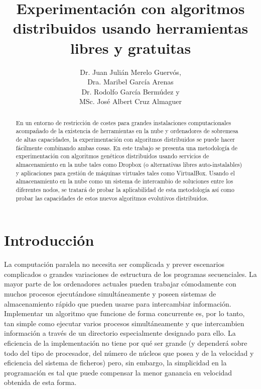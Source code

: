 \documentclass{article}
\title{Experimentación con algoritmos distribuidos usando herramientas libres y gratuitas}
\author{Dr. Juan Julián Merelo Guervós,\\
Dra. Maribel García Arenas\\
Dr. Rodolfo García Bermúdez y \\
MSc. José Albert Cruz Almaguer 
}
\begin{document}
\maketitle

\begin{abstract}
En un entorno de restricción de costes para grandes instalaciones
computacionales acompañado de la existencia de herramientas en la nube
y ordenadores de sobremesa de altas capacidades, la experimentación
con algoritmos distribuidos se puede hacer fácilmente combinando ambas
cosas. En este trabajo se presenta una metodología de experimentación
con algoritmos genéticos distribuidos usando servicios de
almacenamiento en la nube tales como Dropbox (o alternativas libres
auto-instalables) y aplicaciones para gestión de máquinas virtuales
tales como VirtualBox. Usando el almacenamiento en la nube como un
sistema de intercambio de soluciones entre los diferentes nodos, se
tratará de probar la aplicabilidad de esta metodología así como probar
las capacidades de estos nuevos algoritmos evolutivos distribuidos. 
\end{abstract}

\section{Introducción}

La computación paralela no necesita ser complicada y prever escenarios
complicados o grandes variaciones de estructura de los programas
secuenciales. La mayor parte de los ordenadores actuales pueden
trabajar cómodamente con muchos procesos ejecutándose simultáneamente
y poseen sistemas de almacenamiento rápido que pueden usarse para
intercambiar información. Implementar un algoritmo que funcione de
forma concurrente es, por lo tanto, tan simple como ejecutar varios
procesos simultáneamente y que intercambien información a través de un
directorio especialmente designado para ello. La eficiencia de la
implementación no tiene por qué ser grande (y dependerá sobre todo del
tipo de procesador, del número de núcleos que posea y de la velocidad
y eficiencia del sistema de ficheros) pero, sin embargo, la
simplicidad en la programación es tal que puede compensar la menor
ganancia en velocidad obtenida de esta forma. 
\end{document}
